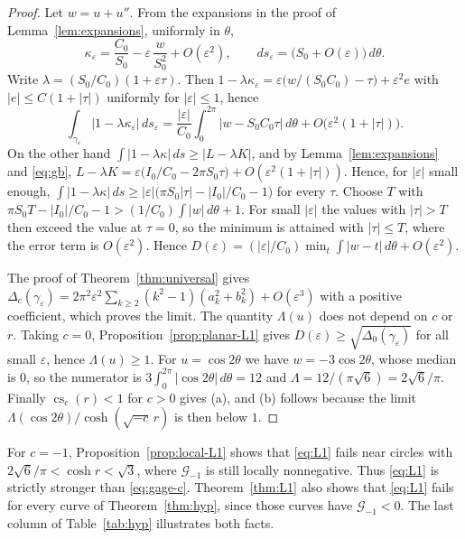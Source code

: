 \documentclass[11pt]{amsart}
\theoremstyle{definition}
\theoremstyle{remark}
\numberwithin{equation}{section}
\DeclareMathOperator{\cs}{cs}
\newcommand{\eps}{\varepsilon}
\newcommand{\G}{\mathcal{G}}
\begin{document}
\begin{proof}
Let $w=u+u''$. From the expansions in the proof of Lemma~\ref{lem:expansions}, uniformly in $\theta$,
\[
\kappa_\eps=\frac{C_0}{S_0}-\eps\,\frac{w}{S_0^2}+O(\eps^2),\qquad ds_\eps=\bigl(S_0+O(\eps)\bigr)\,d\theta .
\]
Write $\lambda=(S_0/C_0)(1+\eps\tau)$. Then $1-\lambda\kappa_\eps=\eps\bigl(w/(S_0C_0)-\tau\bigr)+\eps^2e$ with $|e|\le C(1+|\tau|)$ uniformly for $|\eps|\le1$, hence
\[
\int_{\gamma_\eps}|1-\lambda\kappa_\eps|\,ds_\eps=\frac{|\eps|}{C_0}\int_0^{2\pi}|w-S_0C_0\tau|\,d\theta+O\bigl(\eps^2(1+|\tau|)\bigr).
\]
On the other hand $\int|1-\lambda\kappa|\,ds\ge|L-\lambda K|$, and by Lemma~\ref{lem:expansions} and \eqref{eq:gb}, $L-\lambda K=\eps\bigl(I_0/C_0-2\pi S_0\tau\bigr)+O(\eps^2(1+|\tau|))$. Hence, for $|\eps|$ small enough, $\int|1-\lambda\kappa|\,ds\ge|\eps|\bigl(\pi S_0|\tau|-|I_0|/C_0-1\bigr)$ for every $\tau$. Choose $T$ with $\pi S_0T-|I_0|/C_0-1>(1/C_0)\int|w|\,d\theta+1$. For small $|\eps|$ the values with $|\tau|>T$ then exceed the value at $\tau=0$, so the minimum is attained with $|\tau|\le T$, where the error term is $O(\eps^2)$. Hence $D(\eps)=(|\eps|/C_0)\min_t\int|w-t|\,d\theta+O(\eps^2)$.

The proof of Theorem~\ref{thm:universal} gives $\Delta_c(\gamma_\eps)=2\pi^2\eps^2\sum_{k\ge2}(k^2-1)(a_k^2+b_k^2)+O(\eps^3)$ with a positive coefficient, which proves the limit. The quantity $\Lambda(u)$ does not depend on $c$ or $r$. Taking $c=0$, Proposition~\ref{prop:planar-L1} gives $D(\eps)\ge\sqrt{\Delta_0(\gamma_\eps)}$ for all small $\eps$, hence $\Lambda(u)\ge1$. For $u=\cos2\theta$ we have $w=-3\cos2\theta$, whose median is $0$, so the numerator is $3\int_0^{2\pi}|\cos2\theta|\,d\theta=12$ and $\Lambda=12/(\pi\sqrt6)=2\sqrt6/\pi$. Finally $\cs_c(r)<1$ for $c>0$ gives (a), and (b) follows because the limit $\Lambda(\cos2\theta)/\cosh(\sqrt{-c}\,r)$ is then below $1$.
\end{proof}

For $c=-1$, Proposition~\ref{prop:local-L1} shows that \eqref{eq:L1} fails near circles with $2\sqrt6/\pi<\cosh r<\sqrt3$, where $\G_{-1}$ is still locally nonnegative. Thus \eqref{eq:L1} is strictly stronger than \eqref{eq:gage-c}. Theorem~\ref{thm:L1} also shows that \eqref{eq:L1} fails for every curve of Theorem~\ref{thm:hyp}, since those curves have $\G_{-1}<0$. The last column of Table~\ref{tab:hyp} illustrates both facts.
\end{document}
